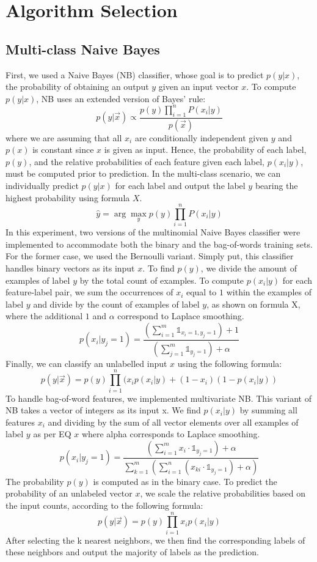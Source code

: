 \documentclass{acm_proc_article-sp}
\begin{document}
\section{Algorithm Selection}
\subsection{Multi-class Naive Bayes}
First, we used a Naive Bayes (NB) classifier, whose goal is to predict $p(y|x)$, the probability of obtaining an output $y$ given an input vector $x$. To compute $p(y|x)$, NB uses an extended version of Bayes' rule:
\[
 p(y| \overrightarrow{x}) \propto \frac{p(y) \prod_{i=1}^n P(x_i | y)}{ p (\overrightarrow{x}) } 
\]
where we are assuming that all $x_i$ are conditionally independent given $y$ and $p(x)$ is constant since $x$ is given as input. Hence, the probability of each label, $p(y)$, and the relative probabilities of each feature given each label, $p(x_i|y)$, must be computed prior to prediction. In the multi-class scenario, we can individually predict $p(y|x)$ for each label and output the label $y$ bearing the highest probability using formula $X$.
\[
 \hat{y} = \arg\max_y p (y) \prod_{i=1}^n P(x_i | y)
\]
In this experiment, two versions of the multinomial Naive Bayes classifier were implemented to accommodate both the binary and the bag-of-words training sets. For the former case, we used the Bernoulli variant. Simply put, this classifier handles binary vectors as its input $x$. To find $p(y)$, we divide the amount of examples of label $y$ by the total count of examples. To compute $p(x_i|y)$ for each feature-label pair, we sum the occurrences of $x_i$ equal to $1$ within the examples of label $y$ and divide by the count of examples of label $y$, as shown on formula X, where the additional $1$ and $\alpha$ correspond to Laplace smoothing. 
\[
p(x_i | y_j=1) = \frac{(\sum_{i=1}^m \mathds{1}_{x_i=1, y_j=1})+1}{(\sum_{j=1}^m \mathds{1}_{y_j=1}) + \alpha}
\]
Finally, we can classify an unlabelled input $x$ using the following formula:
\[
p(y|\overrightarrow{x}) = p(y) \prod_{i=1}^n (x_i p(x_i | y) + (1 - x_i) (1 - p(x_i | y))
\]
To handle bag-of-word features, we implemented multivariate NB. This variant of NB takes a vector of integers as its input x. We find $p(x_i|y)$ by summing all features $x_i$ and dividing by the sum of all vector elements over all examples of label $y$ as per EQ $x$ where alpha corresponds to Laplace smoothing.
\[
p(x_i | y_j =1) = \frac{(\sum_{i=1}^m x_i \cdot \mathds{1}_{y_j=1} ) + \alpha }{\sum_{k=1}^m(\sum_{i=1}^n (x_{ki}\cdot \mathds{1}_{y_j=1})+\alpha)}
\]
The probability $p(y)$ is computed as in the binary case. To predict the probability of an unlabeled vector $x$, we scale the relative probabilities based on the input counts, according to the following formula:
\[
p(y | \overrightarrow{x}) = p(y) \prod_{i=1}^n x_i p(x_i | y)
\]
After selecting the k nearest neighbors, we then find the corresponding labels of these neighbors and output the majority of labels as the prediction.
\end{document}
